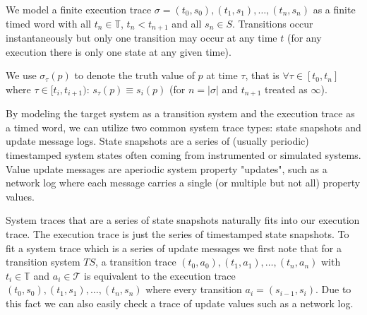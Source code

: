 \documentclass[10pt,a4paper]{article}
\begin{document}
We model a finite execution trace $\sigma = (t_0, s_0),(t_1,s_1),\ldots,(t_n,s_n)$ as a finite timed word with all $t_n \in \mathbb{T}$, $t_n < t_{n+1}$ and all $s_n \in S$. Transitions occur instantaneously but only one transition may occur at any time $t$ (for any execution there is only one state at any given time).

We use $\sigma_{\tau}(p)$ to denote the truth value of $p$ at time $\tau$, that is $\forall \tau \in [t_0, t_n]$ where $\tau \in [t_i, t_{i+1})$: $s_{\tau}(p) \equiv s_i(p)$ (for $n = |\sigma|$ and $t_{n +1}$ treated as $\infty$).



By modeling the target system as a transition system and the execution trace as a timed word, we can utilize two common system trace types: state snapshots and update message logs. State snapshots are a series of (usually periodic) timestamped system states often coming from instrumented or simulated systems. Value update messages are aperiodic system property "updates", such as a network log where each message carries a single (or multiple but not all) property values. %

System traces that are a series of state snapshots naturally fits into our execution trace. The execution trace is just the series of timestamped state snapshots. To fit a system trace which is a series of update messages we first note that for a transition system $TS$, a transition trace $(t_0,a_0),(t_1,a_1),\ldots,(t_n,a_n)$ with $t_i \in \mathbb{T}$ and $a_i \in \mathcal{T}$ is equivalent to the execution trace $(t_0,s_0),(t_1,s_1),\ldots,(t_n,s_n)$ where every transition $a_i = (s_{i-1}, s_i)$. Due to this fact we can also easily check a trace of update values such as a network log.
\end{document}
